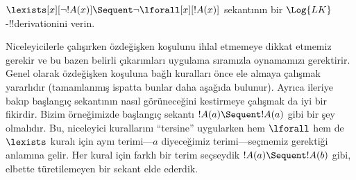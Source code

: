 \documentclass[../../../include/open-logic-section]{subfiles}
\begin{document}


\begin{ex}
$\lexists[x][\lnot !A(x)] \Sequent \lnot \lforall[x][!A(x)]$ sekantının
bir $\Log{LK}$-!!{derivation}{}ini verin.

Niceleyicilerle çalışırken özdeğişken koşulunu ihlal etmemeye dikkat etmemiz
gerekir ve bu bazen belirli çıkarımları uygulama sıramızla oynamamızı
gerektirir. Genel olarak özdeğişken koşuluna bağlı kuralları önce ele almaya
çalışmak yararlıdır (tamamlanmış ispatta bunlar daha aşağıda bulunur). Ayrıca
ileriye bakıp başlangıç sekantının nasıl görüneceğini kestirmeye çalışmak da
iyi bir fikirdir. Bizim örneğimizde başlangıç sekantı $!A(a) \Sequent !A(a)$
gibi bir şey olmalıdır. Bu, niceleyici kurallarını ``tersine'' uygularken hem
$\lforall$ hem de $\lexists$ kuralı için aynı terimi---$a$ diyeceğimiz
terimi---seçmemiz gerektiği anlamına gelir. Her kural için farklı bir terim
seçseydik $!A(a) \Sequent !A(b)$ gibi, elbette türetilemeyen bir sekant elde
ederdik.


\end{ex}
\end{document}
